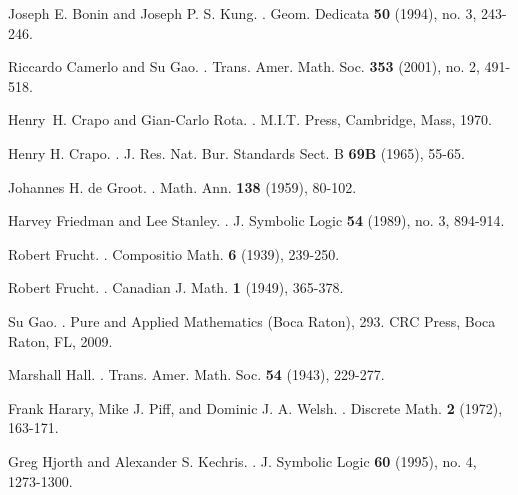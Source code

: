 \documentclass{amsart}
\numberwithin{claimcounter}{theorem}
\begin{document}
\begin{thebibliography}{10}

Joseph E. Bonin and Joseph P. S. Kung.
.
\newblock Geom. Dedicata {\bf 50} (1994), no. 3, 243-246.

Riccardo Camerlo and Su Gao.
.
\newblock Trans. Amer. Math. Soc. {\bf 353} (2001), no. 2, 491-518.

Henry~H. Crapo and Gian-Carlo Rota.
.
\newblock M.I.T. Press, Cambridge, Mass, 1970.

Henry H. Crapo.
.
\newblock J. Res. Nat. Bur. Standards Sect. B {\bf 69B} (1965), 55-65.

Johannes H. de Groot.
.
\newblock Math. Ann. {\bf 138} (1959), 80-102.  

Harvey Friedman and Lee Stanley.
.
\newblock J. Symbolic Logic {\bf 54} (1989), no. 3, 894-914.

Robert Frucht.
.
\newblock Compositio Math. {\bf 6} (1939), 239-250.

Robert Frucht.
.
\newblock Canadian J. Math. {\bf 1} (1949), 365-378.

Su Gao.
.
\newblock Pure and Applied Mathematics (Boca Raton), 293. CRC Press, Boca Raton, FL, 2009. 

Marshall Hall.
.
\newblock Trans. Amer. Math. Soc. {\bf 54} (1943), 229-277.

Frank Harary, Mike J. Piff, and Dominic J. A. Welsh.
.
\newblock Discrete Math. {\bf 2} (1972), 163-171. 

Greg Hjorth and Alexander S. Kechris.
.
\newblock J. Symbolic Logic {\bf 60} (1995), no. 4, 1273-1300.


\end{thebibliography}
\end{document}
